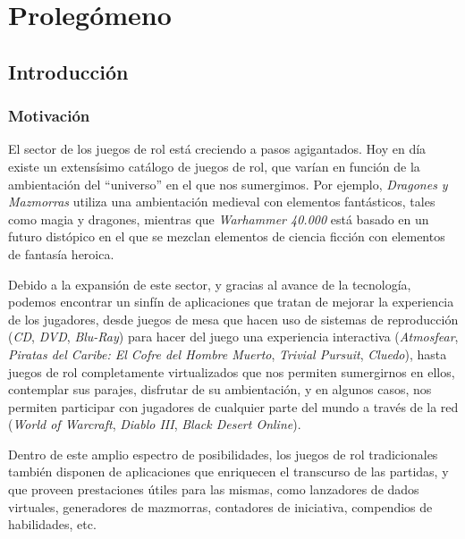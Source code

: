 



\part{Prolegómeno}

\chapter{Introducción}
\thispagestyle{chapterpage}

\section{Motivación}
El sector de los juegos de rol está creciendo a pasos 
agigantados. Hoy en día existe un extensísimo 
catálogo de juegos de rol, que varían en función de la 
ambientación del ``universo'' en el que nos sumergimos. Por 
ejemplo, \textit{Dragones y Mazmorras} utiliza una 
ambientación medieval con elementos fantásticos, tales como 
magia y dragones, mientras que \textit{Warhammer 40.000} 
está basado en un futuro distópico en el que se mezclan 
elementos de ciencia ficción con elementos de fantasía 
heroica. \medskip

Debido a la expansión de este sector, y gracias al avance 
de la tecnología, podemos encontrar un sinfín de aplicaciones 
que tratan de mejorar la experiencia de los jugadores, 
desde juegos de mesa que hacen uso de sistemas de 
reproducción (\textit{CD}, \textit{DVD}, 
\textit{Blu-Ray}) para hacer del juego una experiencia 
interactiva (\textit{Atmosfear}, \textit{Piratas
del Caribe: El Cofre del Hombre Muerto}, \textit{Trivial 
Pursuit}, \textit{Cluedo}), hasta juegos de rol completamente
virtualizados que nos permiten sumergirnos en ellos, contemplar
sus parajes, disfrutar de su ambientación, y en algunos casos, 
nos permiten participar con jugadores de cualquier parte del 
mundo a través de la red (\textit{World of Warcraft}, \textit{Diablo III}, 
\textit{Black Desert Online}). \medskip

Dentro de este amplio espectro de posibilidades, los juegos de rol 
tradicionales también disponen de aplicaciones que enriquecen el 
transcurso de las partidas, y que proveen prestaciones útiles para las 
mismas, como lanzadores de dados virtuales, generadores de mazmorras, 
contadores de iniciativa, compendios de habilidades, etc. \medskip


